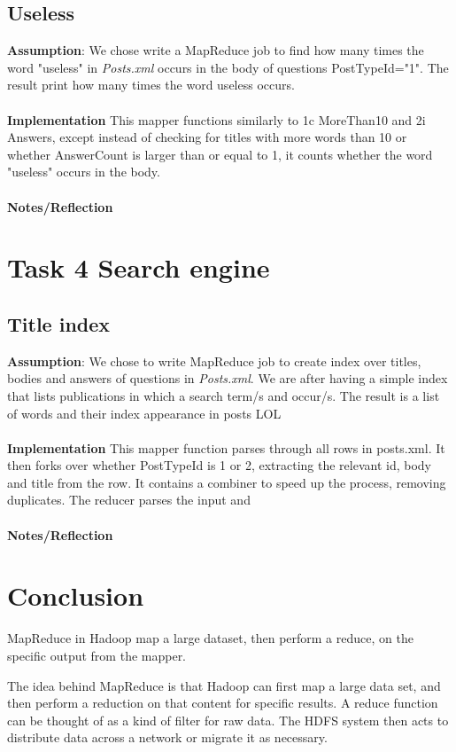 \documentclass[fleqn,10pt]{wlscirep}
\begin{document}
\subsection{Useless}
\textbf{Assumption}:  We chose write a MapReduce job  to find how many times the word "useless" in \textit{Posts.xml} occurs in the body of questions PostTypeId="1". The result print how many times the word useless occurs.  \\ \\
\textbf{Implementation} This mapper functions similarly to 1c MoreThan10 and 2i Answers, except instead of checking for titles with more words than 10 or whether AnswerCount is larger than or equal to 1, it counts whether the word "useless" occurs in the body. \\ \\
\textbf{Notes/Reflection}

\section{Task 4 Search engine}
\subsection{Title index}
\textbf{Assumption}: We chose to write MapReduce job to create index over titles, bodies and answers of questions in \textit{Posts.xml}. We are after having a simple index that lists publications in which a search term/s and occur/s. The result is a list of words and their index appearance in posts LOL \\ \\
\textbf{Implementation} This mapper function parses through all rows in posts.xml. It then forks over whether PostTypeId is 1 or 2, extracting the relevant id, body and title from the row. It contains a combiner to speed up the process, removing duplicates. The reducer parses the input and  \\ \\
\textbf{Notes/Reflection}




\section*{Conclusion}
MapReduce in Hadoop map a large dataset, then perform a reduce, on the specific output from the mapper. 

The idea behind MapReduce is that Hadoop can first map a large data set, and then perform a reduction on that content for specific results. A reduce function can be thought of as a kind of filter for raw data. The HDFS system then acts to distribute data across a network or migrate it as necessary.



\end{document}
